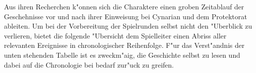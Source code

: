 \vspace{-0.5cm}

Aus ihren Recherchen k"onnen sich die Charaktere einen groben Zeitablauf der Geschehnisse vor und nach ihrer Einweisung bei Cynarian und dem Protektorat ableiten. Um bei der Vorbereitung der Spielrunden selbst nicht den "Uberblick zu verlieren, bietet die folgende "Ubersicht dem Spielleiter einen Abriss aller relevanten Ereignisse in chronologischer Reihenfolge. F"ur das Verst"andnis der unten stehenden Tabelle ist es zweckm"a\3ig, die Geschichte selbst zu lesen und dabei auf die Chronologie bei bedarf zur"uck zu greifen.

